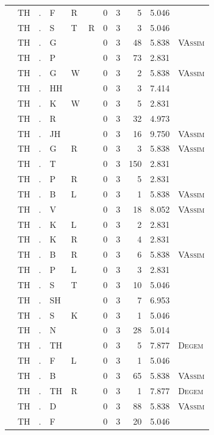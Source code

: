 \documentclass[12pt]{article}
\begin{document}
\begin{longtable}{r@{ } r@{ } c@{ } l@{ } l@{ } l@{ } r r r r l }
 & TH & . & F & R &  & 0 & 3 & 5 & 5.046 &  \\
 & TH & . & S & T & R & 0 & 3 & 3 & 5.046 &  \\
 & TH & . & G &  &  & 0 & 3 & 48 & 5.838 & \textsc{VAssim} \\
 & TH & . & P &  &  & 0 & 3 & 73 & 2.831 &  \\
 & TH & . & G & W &  & 0 & 3 & 2 & 5.838 & \textsc{VAssim} \\
 & TH & . & HH &  &  & 0 & 3 & 3 & 7.414 &  \\
 & TH & . & K & W &  & 0 & 3 & 5 & 2.831 &  \\
 & TH & . & R &  &  & 0 & 3 & 32 & 4.973 &  \\
 & TH & . & JH &  &  & 0 & 3 & 16 & 9.750 & \textsc{VAssim} \\
 & TH & . & G & R &  & 0 & 3 & 3 & 5.838 & \textsc{VAssim} \\
 & TH & . & T &  &  & 0 & 3 & 150 & 2.831 &  \\
 & TH & . & P & R &  & 0 & 3 & 5 & 2.831 &  \\
 & TH & . & B & L &  & 0 & 3 & 1 & 5.838 & \textsc{VAssim} \\
 & TH & . & V &  &  & 0 & 3 & 18 & 8.052 & \textsc{VAssim} \\
 & TH & . & K & L &  & 0 & 3 & 2 & 2.831 &  \\
 & TH & . & K & R &  & 0 & 3 & 4 & 2.831 &  \\
 & TH & . & B & R &  & 0 & 3 & 6 & 5.838 & \textsc{VAssim} \\
 & TH & . & P & L &  & 0 & 3 & 3 & 2.831 &  \\
 & TH & . & S & T &  & 0 & 3 & 10 & 5.046 &  \\
 & TH & . & SH &  &  & 0 & 3 & 7 & 6.953 &  \\
 & TH & . & S & K &  & 0 & 3 & 1 & 5.046 &  \\
 & TH & . & N &  &  & 0 & 3 & 28 & 5.014 &  \\
 & TH & . & TH &  &  & 0 & 3 & 5 & 7.877 & \textsc{Degem} \\
 & TH & . & F & L &  & 0 & 3 & 1 & 5.046 &  \\
 & TH & . & B &  &  & 0 & 3 & 65 & 5.838 & \textsc{VAssim} \\
 & TH & . & TH & R &  & 0 & 3 & 1 & 7.877 & \textsc{Degem} \\
 & TH & . & D &  &  & 0 & 3 & 88 & 5.838 & \textsc{VAssim} \\
 & TH & . & F &  &  & 0 & 3 & 20 & 5.046 &  \\

\end{longtable}
\end{document}
